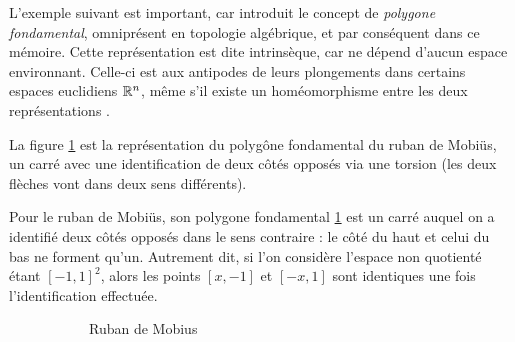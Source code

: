 L'exemple suivant est important, car introduit le concept de \emph{polygone fondamental}, omniprésent en topologie algébrique, et par conséquent dans ce mémoire. Cette représentation est dite intrinsèque, car ne dépend d'aucun espace environnant. Celle-ci est aux antipodes de leurs plongements dans certains espaces euclidiens $\mathbb{R}^n$, même s'il existe un homéomorphisme entre les deux représentations \cite{Homeo-article}.

\begin{exemple}
La figure \ref{tkz:mobius} est la représentation du polygône fondamental du ruban de Mobiüs, un carré avec une identification de deux côtés opposés via une torsion (les deux flèches vont dans deux sens différents).

Pour le ruban de Mobiüs, son polygone fondamental \ref{tkz:mobius} est un carré auquel on a identifié deux côtés opposés dans le sens contraire : le côté du haut et celui du bas ne forment qu'un. Autrement dit, si l'on considère l'espace non quotienté étant $[-1,1]^2$, alors les points $[x,-1]$ et $[-x,1]$ sont identiques une fois l'identification effectuée.
\begin{figure}[H]
\centering
\begin{subfigure}[b]{0.45\linewidth}
\centering
{}
\caption{Ruban de Mobius}
\label{tkz:mobius}
\end{subfigure}
\begin{subfigure}[b]{0.45\linewidth}
\centering
{}
\end{subfigure}
\end{figure}
\end{exemple}

